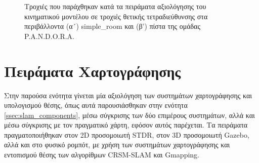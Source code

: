 \begin{figure}[!ht]
	\centering
	 \hspace{0.75cm}
	\caption{Τροχιές που παράχθηκαν κατά τα πειράματα αξιολόγησης του κινηματικού μοντέλου σε τροχιές θετικής τετραδιεύθυνσης στα περιβάλλοντα (α´) simple{\_}room και (β') πίστα της ομάδας P.A.N.D.O.R.A.}
	\label{fig:crab_steering_experiment}
\end{figure}


\section{Πειράματα Χαρτογράφησης} \label{sec:slam_experiments}
Στην παρούσα ενότητα γίνεται μία αξιολόγηση των συστημάτων χαρτογράφησης και υπολογισμού θέσης, όπως αυτά παρουσιάσθηκαν στην ενότητα \ref{ssec:slam_components}, μέσω σύγκρισης των δύο επιμέρους συστημάτων, αλλά και μέσω σύγκρισης με τον πραγματικό χάρτη, εφόσον αυτός παρέχεται. Τα πειράματα πραγματοποιήθηκαν στον 2D προσομοιωτή STDR, στον 3D προσομοιωτή Gazebo, αλλά και στο φυσικό ρομπότ, με χρήση των συστημάτων χαρτογράφησης και εντοπισμού θέσης των αλγορίθμων CRSM-SLAM και Gmapping.

